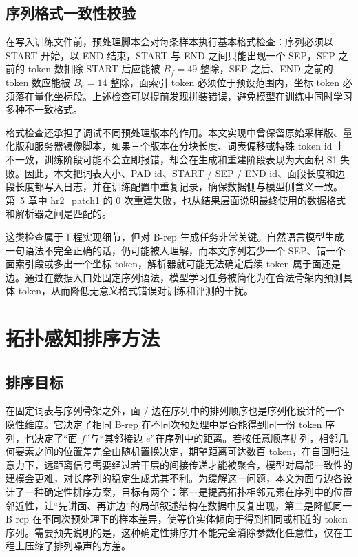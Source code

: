 \subsection{序列格式一致性校验}

在写入训练文件前，预处理脚本会对每条样本执行基本格式检查：序列必须以 START 开始，以 END 结束，START 与 END 之间只能出现一个 SEP，SEP 之前的 token 数扣除 START 后应能被 $B_f = 49$ 整除，SEP 之后、END 之前的 token 数应能被 $B_e = 14$ 整除，面索引 token 必须位于预设范围内，坐标 token 必须落在量化坐标段。上述检查可以提前发现拼装错误，避免模型在训练中同时学习多种不一致格式。

格式检查还承担了调试不同预处理版本的作用。本文实现中曾保留原始采样版、量化版和服务器镜像脚本，如果三个版本在分块长度、词表偏移或特殊 token id 上不一致，训练阶段可能不会立即报错，却会在生成和重建阶段表现为大面积 S1 失败。因此，本文把词表大小、PAD id、START / SEP / END id、面段长度和边段长度都写入日志，并在训练配置中重复记录，确保数据侧与模型侧含义一致。第~5 章中 hr2\_patch1 的 0 次重建失败，也从结果层面说明最终使用的数据格式和解析器之间是匹配的。

这类检查属于工程实现细节，但对 B-rep 生成任务非常关键。自然语言模型生成一句语法不完全正确的话，仍可能被人理解，而本文序列若少一个 SEP、错一个面索引段或多出一个坐标 token，解析器就可能无法确定后续 token 属于面还是边。通过在数据入口处固定序列语法，模型学习任务被简化为在合法骨架内预测具体 token，从而降低无意义格式错误对训练和评测的干扰。

\section{拓扑感知排序方法}

\subsection{排序目标}

在固定词表与序列骨架之外，面 / 边在序列中的排列顺序也是序列化设计的一个隐性维度。它决定了相同 B-rep 在不同次预处理中是否能得到同一份 token 序列，也决定了“面 $f$”与“其邻接边 $e$”在序列中的距离。若按任意顺序排列，相邻几何要素之间的位置差完全由随机置换决定，期望距离可达数百 token，在自回归注意力下，远距离信号需要经过若干层的间接传递才能被聚合，模型对局部一致性的建模会更难，对长序列的稳定生成尤其不利。为缓解这一问题，本文为面与边各设计了一种确定性排序方案，目标有两个：第一是提高拓扑相邻元素在序列中的位置邻近性，让“先讲面、再讲边”的局部叙述结构在数据中反复出现，第二是降低同一 B-rep 在不同次预处理下的样本差异，使等价实体倾向于得到相同或相近的 token 序列。需要预先说明的是，这种确定性排序并不能完全消除参数化任意性，仅在工程上压缩了排列噪声的方差。


